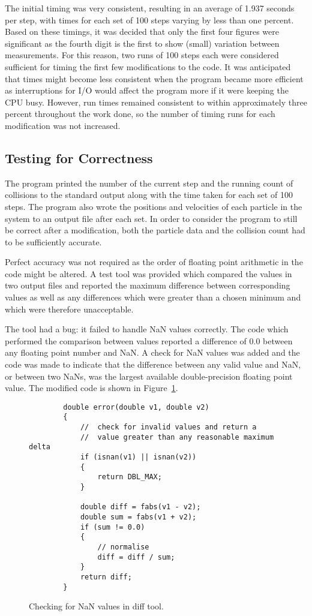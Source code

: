 \documentclass[11pt, oneside]{article}   %
\begin{document}
The initial timing was very consistent, resulting in an average of 1.937 seconds per step, with times for each set of 100 steps varying by less than one percent.
Based on these timings, it was decided that only the first four figures were significant as the fourth digit is the first to show (small) variation between measurements.
For this reason, two runs of 100 steps each were considered sufficient for timing the first few modifications to the code.
It was anticipated that times might become less consistent when the program became more efficient as interruptions for I/O would affect the program more if it were keeping the CPU busy.
However, run times remained consistent to within approximately three percent throughout the work done, so the number of timing runs for each modification was not increased.

\subsection{Testing for Correctness}

The program printed the number of the current step and the running count of collisions to the standard output along with the time taken for each set of 100 steps.
The program also wrote the positions and velocities of each particle in the system to an output file after each set.
In order to consider the program to still be correct after a modification, both the particle data and the collision count had to be sufficiently accurate.  

Perfect accuracy was not required as the order of floating point arithmetic in the code might be altered.
A test tool was provided which compared the values in two output files and reported the maximum difference between corresponding values as well as any differences which were greater than a chosen minimum and which were therefore unacceptable.  

The tool had a bug: it failed to handle NaN values correctly.
The code which performed the comparison between values reported a difference of 0.0 between any floating point number and NaN.
A check for NaN values was added and the code was made to indicate that the difference between any valid value and NaN, or between two NaNs, was the largest available double-precision floating point value.
The modified code is shown in Figure~\ref{figure:NanTest}.

\begin{figure}
	\begin{lstlisting}
		double error(double v1, double v2)
		{
			//  check for invalid values and return a 
			//  value greater than any reasonable maximum delta
			if (isnan(v1) || isnan(v2))
			{
				return DBL_MAX;
			}

			double diff = fabs(v1 - v2);
			double sum = fabs(v1 + v2);
			if (sum != 0.0)
			{
				// normalise
				diff = diff / sum;
			}
			return diff;
		}
	\end{lstlisting}
	\caption{Checking for NaN values in diff tool.}
	\label{figure:NanTest}
\end{figure}
\end{document}
